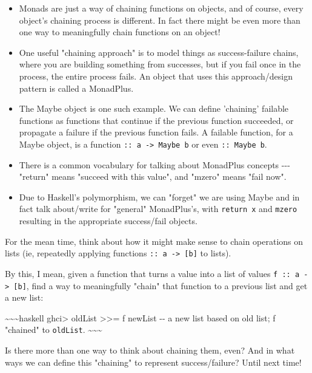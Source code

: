\documentclass[]{article}
\begin{document}
\begin{itemize}
\tightlist
\item
  Monads are just a way of chaining functions on objects, and of course, every
  object's chaining process is different. In fact there might be even more than
  one way to meaningfully chain functions on an object!
\item
  One useful "chaining approach" is to model things as success-failure chains,
  where you are building something from successes, but if you fail once in the
  process, the entire process fails. An object that uses this approach/design
  pattern is called a MonadPlus.
\item
  The Maybe object is one such example. We can define 'chaining' failable
  functions as functions that continue if the previous function succeeded, or
  propagate a failure if the previous function fails. A failable function, for a
  Maybe object, is a function \texttt{::\ a\ -\textgreater{}\ Maybe\ b} or even
  \texttt{::\ Maybe\ b}.
\item
  There is a common vocabulary for talking about MonadPlus concepts -\/-\/-
  "return" means "succeed with this value", and "mzero" means "fail now".
\item
  Due to Haskell's polymorphism, we can "forget" we are using Maybe and in fact
  talk about/write for "general" MonadPlus's, with \texttt{return\ x} and
  \texttt{mzero} resulting in the appropriate success/fail objects.
\end{itemize}

For the mean time, think about how it might make sense to chain operations on
lists (ie, repeatedly applying functions
\texttt{::\ a\ -\textgreater{}\ {[}b{]}} to lists).

By this, I mean, given a function that turns a value into a list of values
\texttt{f\ ::\ a\ -\textgreater{}\ {[}b{]}}, find a way to meaningfully "chain"
that function to a previous list and get a new list:

\textasciitilde{}\textasciitilde{}\textasciitilde{}haskell ghci\textgreater{}
oldList \textgreater{}\textgreater{}= f newList -\/- a new list based on old
list; f "chained" to \texttt{oldList}.
\textasciitilde{}\textasciitilde{}\textasciitilde{}

Is there more than one way to think about chaining them, even? And in what ways
we can define this "chaining" to represent success/failure? Until next time!
\end{document}
